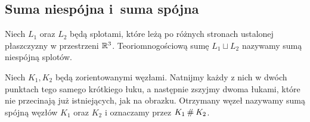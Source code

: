 
\subsection{Suma niespójna i~suma spójna}

\begin{definition}
%
    Niech $L_1$ oraz $L_2$ będą splotami, które leżą po różnych stronach ustalonej płaszczyzny w przestrzeni $\mathbb R^3$.
    Teoriomnogościową sumę $L_1 \sqcup L_2$ nazywamy sumą niespójną splotów.
\end{definition}

\begin{definition}
%
    Niech $K_1, K_2$ będą zorientowanymi węzłami.
    Natnijmy każdy z nich w dwóch punktach tego samego krótkiego łuku, a następnie zszyjmy dwoma łukami, które nie przecinają już istniejących, jak na obrazku.
    Otrzymany węzeł nazywamy sumą spójną węzłów $K_1$ oraz $K_2$ i oznaczamy przez $K_1 \mathbin{\#} K_2$.
\begin{comment}
    \[
        \begin{tikzpicture}[baseline=-0.65ex,scale=0.09]
        \useasboundingbox (-12, -15) rectangle (12, 10);
        \begin{knot}[clip width=5, flip crossing/.list={5}, ignore endpoint intersections=false,]
            \strand[thick] (-3.5, -3.5) [in=down, out=up] to (3.5, 3.5);
            \strand[thick] (3.5, 3.5) [in=right, out=up] to (-4.5, 10);
            \strand[thick] (-4.5, 10) [in=up, out=left] to (-10, 3.5);
            \strand[thick] (-10, 3.5) to (-10, -3.5);
            \strand[thick] (-10, -3.5) [in=left, out=down] to (-4.5, -10);
            \strand[thick] (-4.5, -10) [in=down, out=right] to (3.5, -3.5);
            \strand[thick] (3.5, -3.5) [in=down, out=up] to (-3.5, 3.5);
            \strand[thick] (-3.5, 3.5) [in=left, out=up] to (4.5, 10);
            \strand[thick] (4.5, 10) [in=up, out=right] to (10, 3.5);
            \strand[thick, -Latex] (10, 3.5) to (10, -3.5);
            \strand[thick] (10, -3.5) [in=right, out=down] to (4.5, -10);
            \strand[thick] (4.5, -10) [in=down, out=left] to (-3.5, -3.5);
            \node at (0, -15) {$K_1$};
        \end{knot}
        \end{tikzpicture}
        \shrap
        \begin{tikzpicture}[baseline=-0.65ex,scale=0.09]
        \useasboundingbox (-12, -15) rectangle (12, 10);

\end{comment}
\end{definition}
